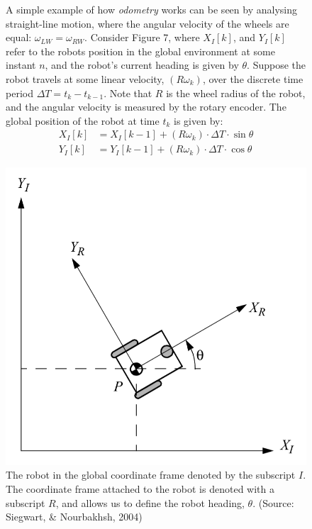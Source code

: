 \documentclass[a4paper]{article}
\begin{document}
\begin{figure}[h]
\begin{minipage}{0.45\textwidth}
A simple example of how \textit{odometry} works can be seen by analysing straight-line motion, where the angular velocity of the wheels are equal: $\omega_{LW} = \omega_{RW}$. Consider Figure 7, where $X_{I}[k]$, and $Y_{I}[k]$ refer to the robots position in the global environment at some instant $n$, and the robot's current heading is given by $\theta$. Suppose the robot travels at some linear velocity, $(R \omega_k)$, over the discrete time period $\Delta T = t_{k} - t_{k-1}$. Note that $R$ is the wheel radius of the robot, and the angular velocity is measured by the rotary encoder. The global position of the robot at time $t_k$ is given by:
\begin{align*}
X_{I}[k] &= X_{I}[k-1] + (R \omega_k)\cdot \Delta T \cdot \sin \theta\\
Y_{I}[k] &= Y_{I}[k-1] + (R \omega_k) \cdot \Delta T \cdot \cos \theta
\end{align*}
\vspace{0.5cm}
\end{minipage}
\hspace{1.25cm}
\begin{minipage}{0.45\textwidth}
\centering
\includegraphics[scale=0.2]{odometry}
\caption{The robot in the global coordinate frame denoted by the subscript $I$. The coordinate frame attached to the robot is denoted with a subscript $R$, and allows us to define the robot heading, $\theta$. (Source: Siegwart, \& Nourbakhsh, 2004)}
\end{minipage}
\end{figure}
\end{document}
